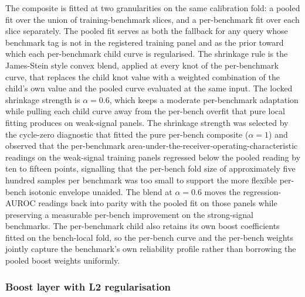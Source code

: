 The composite is fitted at two granularities on the same calibration fold: a pooled fit over the union of training-benchmark slices, and a per-benchmark fit over each slice separately. The pooled fit serves as both the fallback for any query whose benchmark tag is not in the registered training panel and as the prior toward which each per-benchmark child curve is regularised. The shrinkage rule is the James-Stein style convex blend, applied at every knot of the per-benchmark curve, that replaces the child knot value with a weighted combination of the child's own value and the pooled curve evaluated at the same input. The locked shrinkage strength is $\alpha=0.6$, which keeps a moderate per-benchmark adaptation while pulling each child curve away from the per-bench overfit that pure local fitting produces on weak-signal panels. The shrinkage strength was selected by the cycle-zero diagnostic that fitted the pure per-bench composite ($\alpha=1$) and observed that the per-benchmark area-under-the-receiver-operating-characteristic readings on the weak-signal training panels regressed below the pooled reading by ten to fifteen points, signalling that the per-bench fold size of approximately five hundred samples per benchmark was too small to support the more flexible per-bench isotonic envelope unaided. The blend at $\alpha=0.6$ moves the regression-AUROC readings back into parity with the pooled fit on those panels while preserving a measurable per-bench improvement on the strong-signal benchmarks. The per-benchmark child also retains its own boost coefficients fitted on the bench-local fold, so the per-bench curve and the per-bench weights jointly capture the benchmark's own reliability profile rather than borrowing the pooled boost weights uniformly.

\subsubsection{Boost layer with L2 regularisation}
\label{sec:composite-boost}

